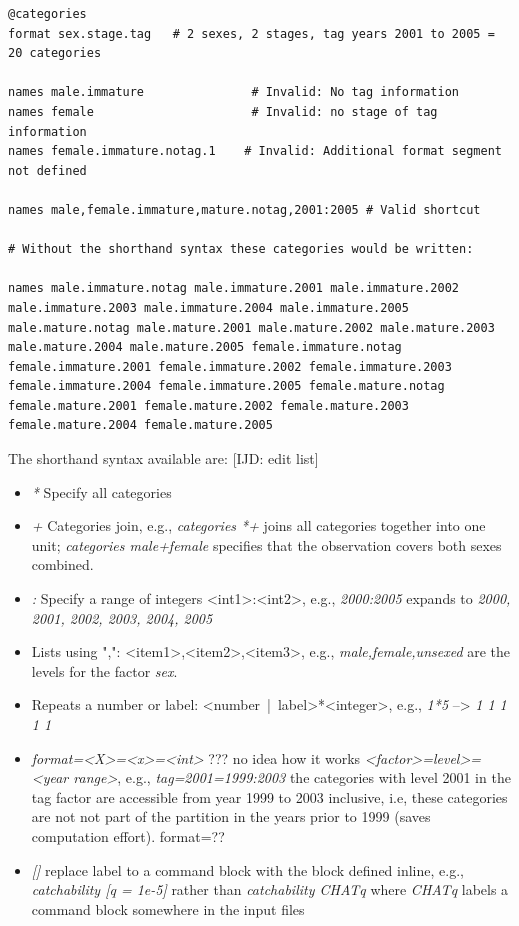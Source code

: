 {\small{\begin{lstlisting}
@categories
format sex.stage.tag   # 2 sexes, 2 stages, tag years 2001 to 2005 = 20 categories

names male.immature               # Invalid: No tag information
names female                      # Invalid: no stage of tag information
names female.immature.notag.1    # Invalid: Additional format segment not defined

names male,female.immature,mature.notag,2001:2005 # Valid shortcut

# Without the shorthand syntax these categories would be written:

names male.immature.notag male.immature.2001 male.immature.2002 male.immature.2003 male.immature.2004 male.immature.2005 male.mature.notag male.mature.2001 male.mature.2002 male.mature.2003 male.mature.2004 male.mature.2005 female.immature.notag female.immature.2001 female.immature.2002 female.immature.2003 female.immature.2004 female.immature.2005 female.mature.notag female.mature.2001 female.mature.2002 female.mature.2003 female.mature.2004 female.mature.2005
\end{lstlisting}}}

The shorthand syntax available are: [IJD: edit list]

\begin{itemize}
	\item \textit{*} Specify all categories
	\item \textit{+} Categories join, e.g., \textit{categories *+} joins all categories together into one unit; \textit{categories male+female}
specifies that the observation covers both sexes combined.
    \item \textit{:} Specify a range of integers <int1>:<int2>, e.g., \textit{2000:2005} expands to \textit{2000, 2001, 2002, 2003, 2004, 2005}
    \item Lists using ",": <item1>,<item2>,<item3>, e.g., \textit{male,female,unsexed} are the levels for the factor \textit{sex}.
    \item Repeats a number or label: <number~|~label>*<integer>, e.g., \textit{1*5} --> \textit{1 1 1 1 1} 
    \item \textit{format=<X>=<x>=<int>}   ??? no idea how it works
    \textit{<factor>=level>=<year range>}, e.g., \textit{tag=2001=1999:2003} the categories with level 2001 in the tag factor are accessible from year 1999 to 2003 inclusive, i.e, these categories are not not part of the partition in the years prior to 1999 (saves computation effort). format=??
    \item \textit{[]} replace label to a command block with the block defined inline, e.g., \textit{catchability [q = 1e-5]} rather than \textit{catchability CHATq} where \textit{CHATq} labels a command block somewhere in the input files
\end{itemize}


